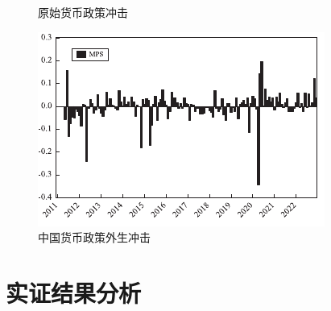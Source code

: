 \documentclass[12pt,aspectratio=169]{ctexbeamer}
\begin{document}
\begin{frame}
\begin{figure}
\begin{minipage}{0.45\textwidth}
						\caption{原始货币政策冲击}
						\label{omp}
					\end{minipage}
					\hfill
					\begin{minipage}{0.25\textwidth}
						\includegraphics[width=\linewidth]{figures/fig.5-3}	
						\caption{中国货币政策外生冲击}
						\label{mps}
					\end{minipage}
				\end{figure}
			\end{frame}
			
			\section{实证结果分析}
\end{document}
